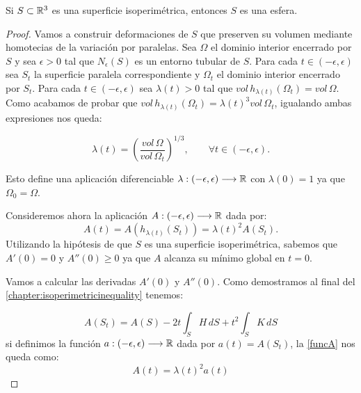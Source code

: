\begin{theorem}
Si $S \subset \mathbb{R}^3$ es una superficie isoperimétrica, entonces $S$ es una esfera.
\end{theorem}
\begin{proof}
Vamos a construir deformaciones de $S$ que preserven su volumen mediante homotecias de la variación por paralelas. Sea $\Omega$ el dominio interior encerrado por $S$ y sea $\epsilon > 0$ tal que $N_\epsilon(S)$ es un entorno tubular de $S$. Para cada $t\in (-\epsilon, \epsilon)$ sea $S_t$ la superficie paralela correspondiente y $\Omega_t$ el dominio interior encerrado por $S_t$. Para cada $t\in (-\epsilon, \epsilon)$ sea $\lambda(t) > 0$ tal que $vol \, h_{\lambda(t)} (\Omega_t) = vol \, \Omega$. Como acabamos de probar que $vol \, h_{\lambda(t)}(\Omega_t) = \lambda(t)^3 vol \, \Omega_t$, igualando ambas expresiones nos queda:

\begin{equation*}\label{lambdafunction}
    \lambda(t) = \left( \frac{vol \, \Omega}{vol \, \Omega_t} \right) ^{1/3}, \qquad \forall t \in (-\epsilon, \epsilon).
\end{equation*}

Esto define una aplicación diferenciable $\lambda: (-\epsilon, \epsilon) \longrightarrow \mathbb{R}$ con $\lambda(0) = 1$ ya que $\Omega_0 = \Omega$. 

Consideremos ahora la aplicación $A: (-\epsilon, \epsilon) \longrightarrow \mathbb{R}$ dada por:
%
\begin{equation}\label{funcA}
    A(t) = A(h_{\lambda(t)} (S_t)) = \lambda(t)^2 A(S_t).
\end{equation}
%
Utilizando la hipótesis de que $S$ es una superficie isoperimétrica, sabemos que $A'(0) = 0$ y $A''(0) \geq 0$ ya que $A$ alcanza su mínimo global en $t=0$.

Vamos a calcular las derivadas $A'(0)$ y $A''(0)$. Como demostramos al final del \autoref{chapter:isoperimetricinequality} tenemos:

\begin{equation*}
    A(S_t) = A(S) -2t\int_{S} H \, dS + t^2\int_{S} K \, dS
\end{equation*}
%
si definimos la función $a: (-\epsilon, \epsilon) \longrightarrow \mathbb{R}$ dada por $a(t) = A(S_t)$, la \autoref{funcA} nos queda como:
%
\begin{equation}
    A(t) = \lambda(t)^2 a(t)
\end{equation}


\end{proof}
